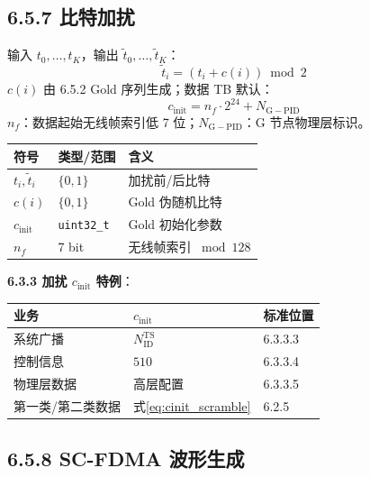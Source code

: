 \documentclass[11pt,a4paper]{ctexart}
\newcommand{\NGPID}{N_{\mathrm{G-PID}}}
\begin{document}
\subsection{6.5.7 比特加扰}

输入 $t_0,\ldots,t_K$，输出 $\tilde{t}_0,\ldots,\tilde{t}_K$：
\begin{equation}
  \tilde{t}_i = (t_i + c(i)) \bmod 2
  \label{eq:scramble}
\end{equation}
$c(i)$ 由 6.5.2 Gold 序列生成；数据 TB 默认：
\begin{equation}
  c_{\mathrm{init}} = n_f \cdot 2^{24} + \NGPID
  \label{eq:cinit_scramble}
\end{equation}
$n_f$：数据起始无线帧索引低 7 位；$\NGPID$：G 节点物理层标识。

\begin{table}[h]
\centering
\small
\begin{tabular}{llp{7cm}}
\toprule
\textbf{符号} & \textbf{类型/范围} & \textbf{含义} \\
\midrule
$t_i,\tilde{t}_i$ & $\{0,1\}$ & 加扰前/后比特 \\
$c(i)$ & $\{0,1\}$ & Gold 伪随机比特 \\
$c_{\mathrm{init}}$ & \texttt{uint32\_t} & Gold 初始化参数 \\
$n_f$ & 7 bit & 无线帧索引 $\bmod 128$ \\
\bottomrule
\end{tabular}
\end{table}

\textbf{6.3.3 加扰 $c_{\mathrm{init}}$ 特例}：

\begin{table}[h]
\centering
\small
\begin{tabular}{lll}
\toprule
\textbf{业务} & \textbf{$c_{\mathrm{init}}$} & \textbf{标准位置} \\
\midrule
系统广播 & $N_{\mathrm{ID}}^{\mathrm{TS}}$ & 6.3.3.3 \\
控制信息 & $510$ & 6.3.3.4 \\
物理层数据 & 高层配置 & 6.3.3.5 \\
第一类/第二类数据 & 式\eqref{eq:cinit_scramble} & 6.2.5 \\
\bottomrule
\end{tabular}
\end{table}

\subsection{6.5.8 SC-FDMA 波形生成}
\end{document}
